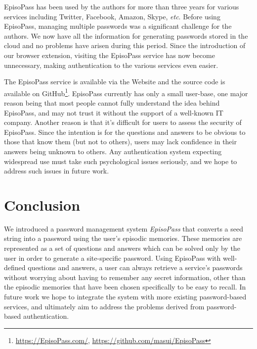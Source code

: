 \documentclass[runningheads,a4paper]{llncs}
\begin{document}
EpisoPass has been used by the authors for more than three years
for various services including Twitter, Facebook, Amazon, Skype, {\it etc}.
%
Before using EpisoPass, managing multiple passwords was a significant challenge
for the authors. We now have all the information for generating passwords 
stored in the cloud and no problems have arisen during this period.
%
Since the introduction of our browser extension, visiting the EpisoPass 
service has now become unnecessary, making authentication to the various
services even easier.

The EpisoPass service is available via the Website and the source code is
available on GitHub\footnote{
  \url{https://EpisoPass.com/},
  \url{https://github.com/masui/EpisoPass}
}. EpisoPass currently has only a small user-base, one major
reason being that most people cannot fully understand the
idea behind EpisoPass, and may not trust it without the 
support of a well-known IT company.
Another reason is that it's difficult for users to
assess the security of EpisoPass.
Since the intention is for the questions and answers to be obvious
to those that know them (but not to others), users may lack
confidence in their answers being unknown to others.
Any authentication system expecting widespread use must take
such psychological issues seriously, and we hope to address 
such issues in future work.

\section{Conclusion}

We introduced a password management system {\it EpisoPass\/}
that converts a seed string into a password using the user's
episodic memories. These memories are represented as a set of questions and answers
which can be solved only by the user in order to generate a site-specific password.
%
Using EpisoPass with well-defined questions and answers,
a user can always retrieve a service's passwords without worrying about
having to remember any secret information, other than the episodic memories
that have been chosen specifically to be easy to recall.
%
In future work we hope to integrate the system with more existing password-based
services, and ultimately aim to address the problems
derived from password-based authentication.

%
%
\end{document}
